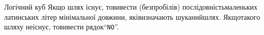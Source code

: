\begin{problemAllDefault}{Логічний куб}
\OutputFile{}\label{text:log-cude-as-example-of-non-unique-correct-answer}
Якщо шлях існує, то\nolinebreak[2] вивести (без\nolinebreak[2] пробілів) послідовність\linebreak[1] маленьких латинських літер мінімальної довжини, які\nolinebreak[2] визначають шуканий\nolinebreak[2] шлях. Якщо\nolinebreak[2] такого шляху не\nolinebreak[3] існує, то\nolinebreak[2] вивести рядок\nolinebreak[3] ``\texttt{NO}''.

\Examples
\ifAfour\hspace{-1em}\fi
\begin{exampleSimple}{3em}{3em}%
%
\end{exampleSimple}
\ifAfour\hspace{-1em}\fi
\begin{exampleSimple}{3em}{3em}%
%
\end{exampleSimple}
\ifAfour\hspace*{-1em}\fi

\end{problemAllDefault}

